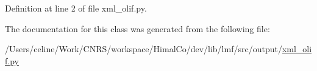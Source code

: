 Definition at line 2 of file xml\+\_\+olif.\+py.



The documentation for this class was generated from the following file\+:\begin{DoxyCompactItemize}
\item 
/\+Users/celine/\+Work/\+C\+N\+R\+S/workspace/\+Himal\+Co/dev/lib/lmf/src/output/\hyperlink{xml__olif_8py}{xml\+\_\+olif.\+py}\end{DoxyCompactItemize}
